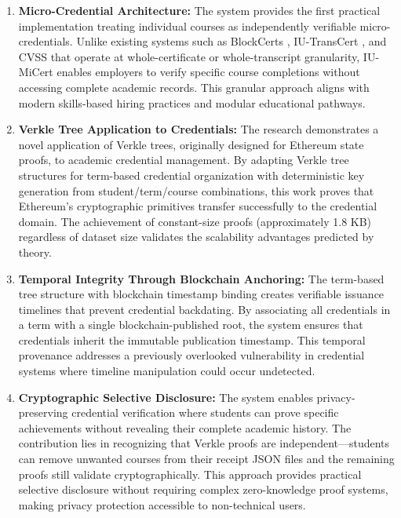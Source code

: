 \begin{enumerate}
    \item \textbf{Micro-Credential Architecture:} The system provides the first practical implementation treating individual courses as independently verifiable micro-credentials. Unlike existing systems such as BlockCerts \cite{blockcerts_mit}, IU-TransCert \cite{le_iutranscert}, and CVSS \cite{nguyen2018cvss} that operate at whole-certificate or whole-transcript granularity, IU-MiCert enables employers to verify specific course completions without accessing complete academic records. This granular approach aligns with modern skills-based hiring practices and modular educational pathways.

    \item \textbf{Verkle Tree Application to Credentials:} The research demonstrates a novel application of Verkle trees, originally designed for Ethereum state proofs, to academic credential management. By adapting Verkle tree structures for term-based credential organization with deterministic key generation from student/term/course combinations, this work proves that Ethereum's cryptographic primitives transfer successfully to the credential domain. The achievement of constant-size proofs (approximately 1.8 KB) regardless of dataset size validates the scalability advantages predicted by theory.

    \item \textbf{Temporal Integrity Through Blockchain Anchoring:} The term-based tree structure with blockchain timestamp binding creates verifiable issuance timelines that prevent credential backdating. By associating all credentials in a term with a single blockchain-published root, the system ensures that credentials inherit the immutable publication timestamp. This temporal provenance addresses a previously overlooked vulnerability in credential systems where timeline manipulation could occur undetected.

    \item \textbf{Cryptographic Selective Disclosure:} The system enables privacy-preserving credential verification where students can prove specific achievements without revealing their complete academic history. The contribution lies in recognizing that Verkle proofs are independent—students can remove unwanted courses from their receipt JSON files and the remaining proofs still validate cryptographically. This approach provides practical selective disclosure without requiring complex zero-knowledge proof systems, making privacy protection accessible to non-technical users.


\end{enumerate}
